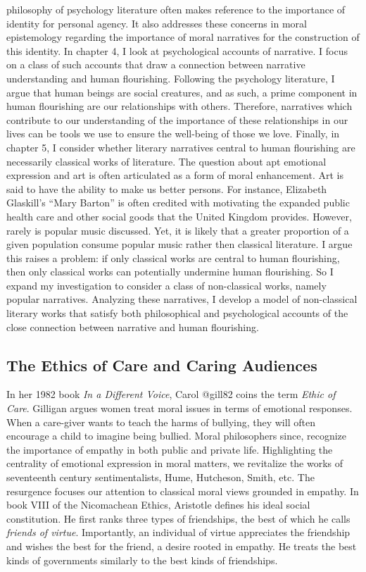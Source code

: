 \documentclass[
  letterpaper,
  DIV=11,
  numbers=noendperiod]{scrartcl}
\theoremstyle{remark}
\begin{document}
philosophy of psychology literature often makes reference to the
importance of identity for personal agency. It also addresses these
concerns in moral epistemology regarding the importance of moral
narratives for the construction of this identity. In chapter 4, I look
at psychological accounts of narrative. I focus on a class of such
accounts that draw a connection between narrative understanding and
human flourishing. Following the psychology literature, I argue that
human beings are social creatures, and as such, a prime component in
human flourishing are our relationships with others. Therefore,
narratives which contribute to our understanding of the importance of
these relationships in our lives can be tools we use to ensure the
well-being of those we love. Finally, in chapter 5, I consider whether
literary narratives central to human flourishing are necessarily
classical works of literature. The question about apt emotional
expression and art is often articulated as a form of moral enhancement.
Art is said to have the ability to make us better persons. For instance,
Elizabeth Glaskill's ``Mary Barton'' is often credited with motivating
the expanded public health care and other social goods that the United
Kingdom provides. However, rarely is popular music discussed. Yet, it is
likely that a greater proportion of a given population consume popular
music rather then classical literature. I argue this raises a problem:
if only classical works are central to human flourishing, then only
classical works can potentially undermine human flourishing. So I expand
my investigation to consider a class of non-classical works, namely
popular narratives. Analyzing these narratives, I develop a model of
non-classical literary works that satisfy both philosophical and
psychological accounts of the close connection between narrative and
human flourishing.

\subsection{The Ethics of Care and Caring
Audiences}\label{the-ethics-of-care-and-caring-audiences}

In her 1982 book \emph{In a Different Voice}, Carol @gill82 coins the
term \emph{Ethic of Care}. Gilligan argues women treat moral issues in
terms of emotional responses. When a care-giver wants to teach the harms
of bullying, they will often encourage a child to imagine being bullied.
Moral philosophers since, recognize the importance of empathy in both
public and private life. Highlighting the centrality of emotional
expression in moral matters, we revitalize the works of seventeenth
century sentimentalists, Hume, Hutcheson, Smith, etc. The resurgence
focuses our attention to classical moral views grounded in empathy. In
book VIII of the Nicomachean Ethics, Aristotle defines his ideal social
constitution. He first ranks three types of friendships, the best of
which he calls \emph{friends of virtue}. Importantly, an individual of
virtue appreciates the friendship and wishes the best for the friend, a
desire rooted in empathy. He treats the best kinds of governments
similarly to the best kinds of friendships.
\end{document}
